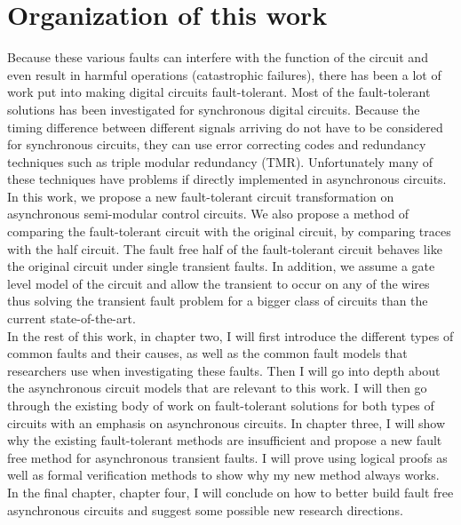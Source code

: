 \documentclass[12pt]{report}
\begin{document}
\section{Organization of this work}
Because these various faults can interfere with the function of the circuit and even result in harmful operations (catastrophic failures), there has been a lot of work put into making digital circuits fault-tolerant. Most of the fault-tolerant solutions has been investigated for synchronous digital circuits.  Because the timing difference between different signals arriving do not have to be considered for synchronous circuits, they can use error correcting codes and redundancy techniques such as triple modular redundancy (TMR). Unfortunately many of these techniques have problems if directly implemented in asynchronous circuits.\\

In this work, we propose a new fault-tolerant circuit transformation on asynchronous semi-modular control circuits.  We also propose a method of comparing the fault-tolerant circuit with the original circuit, by comparing traces with the half circuit.  The fault free half of the fault-tolerant circuit behaves like the original circuit under single transient faults.  In addition, we assume a gate level model of the circuit and allow the transient to occur on any of the wires thus solving the transient fault problem for a bigger class of circuits than the current state-of-the-art.\\

In the rest of this work, in chapter two, I will first introduce the different types of common faults and their causes, as well as the common fault models that researchers use when investigating these faults.  Then I will go into depth about the asynchronous circuit models that are relevant to this work.  I will then go through the existing body of work on fault-tolerant solutions for both types of circuits with an emphasis on asynchronous circuits.  In chapter three, I will show why the existing fault-tolerant methods are insufficient and propose a new fault free method for asynchronous transient faults.  I will prove using logical proofs as well as formal verification methods to show why my new method always works.  In the final chapter, chapter four, I will conclude on how to better build fault free asynchronous circuits and suggest some possible new research directions.
\end{document}

